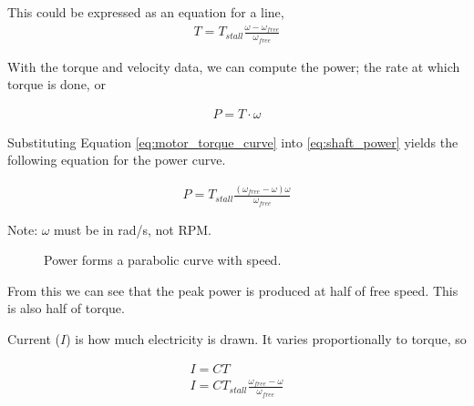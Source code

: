 This could be expressed as an equation for a line,
\begin{align} \label{eq:motor_torque_curve}
  T = T_{stall} \frac{\omega-\omega_{free}}{\omega_{free}}
\end{align}

With the torque and velocity data, we can compute the power; the rate at which torque is done, or

\begin{align} \label{eq:shaft_power}
  P = T \cdot \omega
\end{align}

Substituting Equation \ref{eq:motor_torque_curve} into \ref{eq:shaft_power} yields the following equation for the power curve.

\begin{align} \label{eq:motor_power_curve}
  P = T_{stall} \frac{(\omega_{free}-\omega) \omega}{\omega_{free}}
\end{align}

Note: $\omega$ must be in rad/s, not RPM.

\begin{figure}[H] \centering \label{fig:motor_power_curve}
\caption{Power forms a parabolic curve with speed.}
\end{figure}

From this we can see that the peak power is produced at half of free speed. This is also half of torque.

Current ($I$) is how much electricity is drawn. It varies proportionally to torque, so

\begin{align} \label{eq:motor_current_curve}
  I = C T \nonumber \\
  I = C T_{stall} \frac{\omega_{free}-\omega}{\omega_{free}}
\end{align}

